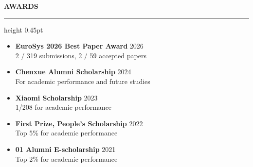 \documentclass[10pt,letterpaper]{article}
\newcommand{\resumesection}[1]{%
  \par\vspace{4pt}%
  {\fontsize{12.3}{13.5}\selectfont\bfseries\MakeUppercase{#1}}\par
  \vspace{0.5pt}%
  {\color{rulegray}\hrule height 0.45pt}%
  \vspace{2pt}%
}
\begin{document}
\resumesection{Awards}
\begin{itemize}
  \item {\textbf{EuroSys 2026 Best Paper Award} \hfill 2026
   \\2 / 319 submissions, 2 / 59 accepted papers}
  \item {\textbf{Chenxue Alumni Scholarship} \hfill 2024
   \\For academic performance and future studies}
  \item {\textbf{Xiaomi Scholarship} \hfill 2023 
   \\1/208 for academic performance}
  \item {\textbf{First Prize, People's Scholarship} \hfill 2022 
   \\Top 5\% for academic performance}
  \item {\textbf{01 Alumni E-scholarship} \hfill 2021
   \\Top 2\% for academic performance}
\end{itemize}


\end{document}

